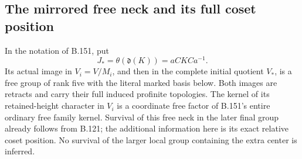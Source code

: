 \subsection*{The mirrored free neck and its full coset position}
\label{stmt:B152}
In the notation of B.151, put
\[
 J_*=\theta(\mathfrak d(K))=aCKCa^{-1}.
\]
Its actual image in \(V_i=V/M_i\), and then in the complete
initial quotient \(V_*\), is a free group of rank five with
the literal marked basis below. Both images are retracts
and carry their full induced profinite topologies.
The kernel of its retained-height character in \(V_i\) is a
coordinate free factor of B.151's entire ordinary free family
kernel. Survival of this free neck in the later final group
already follows from B.121; the additional information here
is its exact relative coset position. No survival of the
larger local group containing the extra center is inferred.

